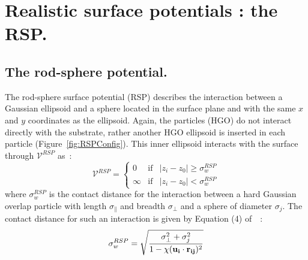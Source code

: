 
\section{Realistic surface potentials : the RSP.}
\label{s:realisticPotentials_RSP}


\subsection{The rod-sphere potential.}
\label{ss:RSP_potential}



The rod-sphere surface potential (RSP) describes the interaction between a Gaussian ellipsoid and a
sphere located in the surface plane and with the same $x$ and $y$ coordinates as the ellipsoid. 
Again, the particles (HGO) do not interact directly with the substrate, rather another
HGO ellipsoid is inserted in each particle (\eg Figure~\ref{fig:RSPConfig}). 
This inner ellipsoid interacts with the surface through $\mathcal{V}^{RSP}$ as~:
%
\begin{equation}
	\mathcal{V}^{RSP} = \left\{	%
	\begin{array}{ccc}
		0	&\mathrm{if}	&|z_i - z_0| \geq \sigma^{RSP}_w	\\
		\infty	&\mathrm{if}	&|z_i - z_0| < \sigma^{RSP}_w	
	\end{array}
	\right.
\end{equation}
%
where $\sigma^{RSP}_w$ is the contact distance for the interaction between a hard Gaussian 
overlap particle  with length $\sigma_\parallel$ and breadth $\sigma_\perp$ and a sphere of diameter 
$\sigma_j$. The contact distance for such an interaction is given by Equation 
(4) of~\cite{BernePechukas72}~:
%
\begin{equation}
	\sigma^{RSP}_w = \sqrt{
	\frac{\sigma^2_\perp + \sigma^2_j}
	{1 - \chi(\mathbf{u_i} \cdot \mathbf{r_{ij}})^2 }
	}
	\label{eqn:sw_RSP_BP}
\end{equation}

